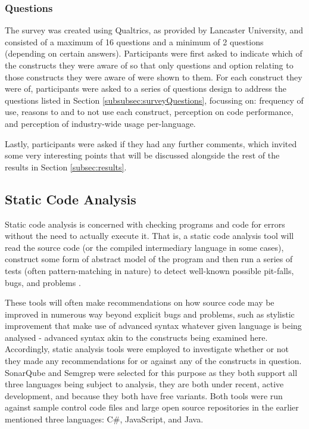 \documentclass{article}
\begin{document}
        \subsubsection{Questions}
            The survey was created using Qualtrics, as provided by Lancaster University, and consisted of a maximum of 16 questions and a minimum of 2 questions (depending on certain answers).
            Participants were first asked to indicate which of the constructs they were aware of so that only questions and option relating to those constructs they were aware of were shown to them. For each construct they were of, participants were asked to a series of questions design to address the questions listed in Section \ref{subsubsec:surveyQuestions}, focussing on: frequency of use, reasons to and to not use each construct, perception on code performance, and perception of industry-wide usage per-language.
            
            Lastly, participants were asked if they had any further comments, which invited some very interesting points that will be discussed alongside the rest of the results in Section \ref{subsec:results}.
    \subsection{Static Code Analysis}
        Static code analysis is concerned with checking programs and code for errors without the need to actually execute it. That is, a static code analysis tool will read the source code (or the compiled intermediary language in some cases), construct some form of abstract model of the program and then run a series of tests (often pattern-matching in nature) to detect well-known possible pit-falls, bugs, and problems \cite{staticCodeAnalysis}.

        These tools will often make recommendations on how source code may be improved in numerous way beyond explicit bugs and problems, such as stylistic improvement that make use of advanced syntax whatever given language is being analysed - advanced syntax akin to the constructs being examined here. Accordingly, static analysis tools were employed to investigate whether or not they made any recommendations for or against any of the constructs in question. SonarQube and Semgrep were selected for this purpose as they both support all three languages being subject to analysis, they are both under recent, active development, and because they both have free variants. Both tools were run against sample control code files and large open source repositories in the earlier mentioned three languages: C\#, JavaScript, and Java.
            
\end{document}
